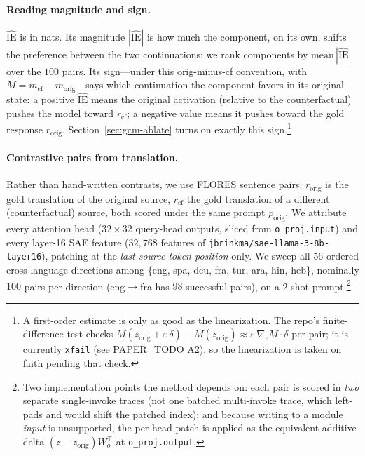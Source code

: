 \documentclass[11pt]{article}
\begin{document}
\paragraph{Reading magnitude and sign.} $\widehat{\mathrm{IE}}$ is in nats. Its
magnitude $|\widehat{\mathrm{IE}}|$ is how much the component, on its own, shifts
the preference between the two continuations; we rank components by
$\mathrm{mean}\,|\widehat{\mathrm{IE}}|$ over the $100$ pairs. Its sign---under
this orig-minus-cf convention, with $M = m_{\text{cf}} - m_{\text{orig}}$---says
which continuation the component favors in its original state: a positive
$\widehat{\mathrm{IE}}$ means the original activation (relative to the
counterfactual) pushes the model toward $r_{\text{cf}}$; a negative value means
it pushes toward the gold response $r_{\text{orig}}$. Section~\ref{sec:gcm-ablate}
turns on exactly this sign.\footnote{A first-order estimate is only as good as
the linearization. The repo's finite-difference test checks
$M(z_{\text{orig}}+\varepsilon\,\delta) - M(z_{\text{orig}}) \approx
\varepsilon\,\nabla_z M\cdot\delta$ per pair; it is currently \texttt{xfail}
(see PAPER\_TODO A2), so the linearization is taken on faith pending that check.}

\paragraph{Contrastive pairs from translation.} Rather than hand-written
contrasts, we use FLORES sentence pairs: $r_{\text{orig}}$ is the gold
translation of the original source, $r_{\text{cf}}$ the gold translation of a
different (counterfactual) source, both scored under the same prompt
$p_{\text{orig}}$. We attribute every attention head ($32\times32$ query-head
outputs, sliced from \texttt{o\_proj.input}) and every layer-16 SAE feature
($32{,}768$ features of \texttt{jbrinkma/sae-llama-3-8b-layer16}), patching at
the \emph{last source-token position} only. We sweep all $56$ ordered
cross-language directions among
\{eng, spa, deu, fra, tur, ara, hin, heb\}, nominally $100$ pairs per direction
(eng$\to$fra has $98$ successful pairs), on a 2-shot prompt.\footnote{Two
implementation points the method depends on: each
pair is scored in \emph{two} separate single-invoke traces (not one batched
multi-invoke trace, which left-pads and would shift the patched index); and
because writing to a module \emph{input} is unsupported, the per-head patch is
applied as the equivalent additive delta $(z-z_{\text{orig}})W_o^{\!\top}$ at
\texttt{o\_proj.output}.}
\end{document}
